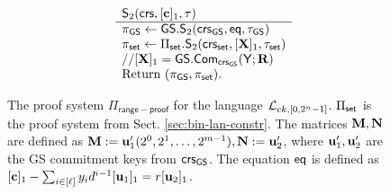 \begin{figure}
$$\begin{array}{ll}
&
\begin{array}{l}
{\mathsf{S}_2(\mathsf{crs},[\mathbf{c}]_1,\tau)}\\
\hline
\pi_{\mathsf{GS}}\gets {\mathsf{GS}}.\mathsf{S}_2(\mathsf{crs}_{\mathsf{GS}},\mathsf{eq},\tau_{\mathsf{GS}})\\
\pi_{\mathsf{set}}\gets \Pi_{\mathsf{set}}.\mathsf{S}_2(\mathsf{crs}_{\mathsf{set}},[\mathbf{{X}}]_1,\tau_{\mathsf{set}})\\
//{[\mathbf{{X}}]_1={\mathsf{GS}}.\mathsf{Com}_{\mathsf{crs}_{\mathsf{GS}}}({\mathbf{{\mathsf{Y}}}};\mathbf{{R}})}\\
\text{Return }  (\pi_{\mathsf{GS}},\pi_{\mathsf{set}}).
\end{array}
\end{array}$$
\caption{The proof system $\Pi_\mathsf{range-proof}$ for the language $\mathcal{L}_{ck,[0,2^n-1]}$. $\Pi_{\mathsf{set}}$ is the proof system from Sect. \ref{sec:bin-lan-constr}. The matrices $\mathbf{{M}},\mathbf{{N}}$ are defined as $\mathbf{{M}}:=\mathbf{u}'_1(2^0,2^1,\ldots,2^{m-1}),\mathbf{{N}}:=\mathbf{u}'_2$, where $\mathbf{u}'_1,\mathbf{u}'_2$ are the GS commitment keys from $\mathsf{crs}_{\mathsf{GS}}$. The equation $\mathsf{eq}$ is defined as $[\mathbf{c}]_1-\sum_{i\in[\ell]}{y}_id^{i-1}[\mathbf{u}_1]_1=r[\mathbf{u}_2]_1$.
\label{fig:rp}}
\end{figure}

